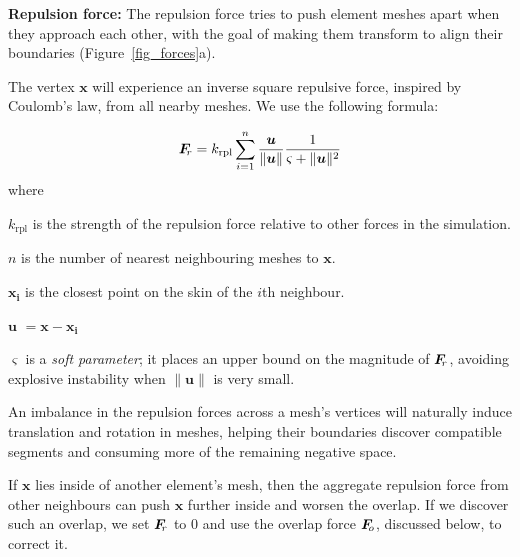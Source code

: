 

\medskip
\textbf{Repulsion force:} 
The repulsion force tries to push element meshes apart when they approach
each other, with the goal of
making them transform to align their boundaries (Figure~\ref{fig_forces}a).
 
The vertex $\bm{x}$ will
experience an inverse square repulsive force, inspired by Coulomb's law,
from all nearby meshes.  We use the following formula:

\begin{equation}
\simforce{r} = k_\mathrm{rpl} \sum_{i = 1}^{n} \frac{\bm{u}}{\| \bm{u} \| }\frac{1}{\varsigma  +\| \bm{u} \|^2 }
\end{equation}
where 
\begin{packeddescriptions}
	\item[$k_\mathrm{rpl}$]        is the strength of the repulsion force relative to
						other forces in the simulation.
	\item[$n$]        is the number of nearest neighbouring meshes to $\bm{x}$. 
	\item[$\bm{x_{i}}$] is the closest point on the skin of the $i$th neighbour.
	\item[$\bm{u}$]  $= \bm{x} - \bm{x_{i}}$
	
	
	\item[$\varsigma$]   is a \textit{soft parameter}; it places an upper 
						bound on the magnitude of $\simforce{r}$, avoiding
						explosive instability when $\| \bm{u} \|$ is very small.
\end{packeddescriptions}

An imbalance in the repulsion forces across a mesh's vertices will
naturally induce translation and rotation in meshes, helping their
boundaries discover compatible segments and consuming more of the
remaining negative space.

If $\bm{x}$ lies inside of another element's mesh, then the aggregate repulsion
force from other neighbours can push $\bm{x}$ further inside and
worsen the overlap.  If we discover such an overlap, we set
$\simforce{r}$ to $0$ and use the overlap force $\simforce{o}$, discussed below, to
correct it.

